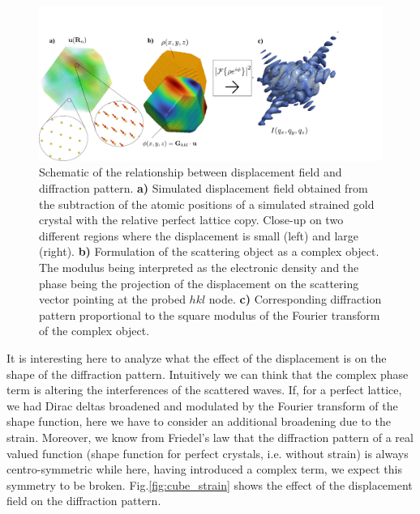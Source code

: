 \begin{figure}[H]
    \centering
    \includegraphics[width=\textwidth]{figures/Intro/displacement.pdf}
    \caption{Schematic of the relationship between displacement field and diffraction pattern. \textbf{a)} Simulated 
    displacement field obtained from the subtraction of the atomic positions of a simulated strained gold crystal with 
    the relative perfect lattice copy. Close-up on two different regions where the displacement is small (left) and large (right). 
    \textbf{b)} Formulation of the scattering object as a complex object. The modulus being interpreted as the electronic 
    density and the phase being the projection of the displacement on the scattering vector pointing at the probed $hkl$ node. 
    \textbf{c)} Corresponding diffraction pattern proportional to the square modulus of the Fourier transform of the complex object.}
    \label{fig:displacement}
\end{figure}

It is interesting here to analyze what the effect of the displacement is on the shape of the diffraction pattern. Intuitively 
we can think that the complex phase term is altering the interferences of the scattered waves. If, for a perfect lattice, we 
had Dirac deltas broadened and modulated by the Fourier transform of the shape function, here we have to consider an additional 
broadening due to the strain. Moreover, we know from Friedel's law \cite{Friedel} that the diffraction pattern of a 
real valued function (shape function 
for perfect crystals, i.e. without strain) is always centro-symmetric while here, having introduced a complex term, we expect this symmetry to be broken. 
Fig.\ref{fig:cube_strain} shows the effect of the displacement field on the diffraction pattern. 


